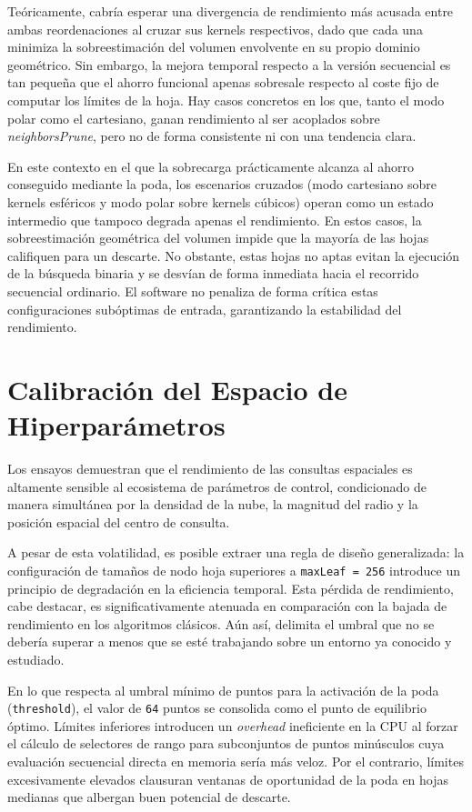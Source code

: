 Teóricamente, cabría esperar una divergencia de rendimiento más acusada entre ambas reordenaciones al cruzar sus kernels respectivos, dado que cada una minimiza la sobreestimación del volumen envolvente en su propio dominio geométrico. Sin embargo, la mejora temporal respecto a la versión secuencial es tan pequeña que el ahorro funcional apenas sobresale respecto al coste fijo de computar los límites de la hoja. Hay casos concretos en los que, tanto el modo polar como el cartesiano, ganan rendimiento al ser acoplados sobre \textit{neighborsPrune}, pero no de forma consistente ni con una tendencia clara.

En este contexto en el que la sobrecarga prácticamente alcanza al ahorro conseguido mediante la poda, los escenarios cruzados (modo cartesiano sobre kernels esféricos y modo polar sobre kernels cúbicos) operan como un estado intermedio que tampoco degrada apenas el rendimiento. En estos casos, la sobreestimación geométrica del volumen impide que la mayoría de las hojas califiquen para un descarte. No obstante, estas hojas no aptas evitan la ejecución de la búsqueda binaria y se desvían de forma inmediata hacia el recorrido secuencial ordinario. El software no penaliza de forma crítica estas configuraciones subóptimas de entrada, garantizando la estabilidad del rendimiento.

\section{Calibración del Espacio de Hiperparámetros}

Los ensayos demuestran que el rendimiento de las consultas espaciales es altamente sensible al ecosistema de parámetros de control, condicionado de manera simultánea por la densidad de la nube, la magnitud del radio y la posición espacial del centro de consulta. 

A pesar de esta volatilidad, es posible extraer una regla de diseño generalizada: la configuración de tamaños de nodo hoja superiores a \texttt{maxLeaf = 256} introduce un principio de degradación en la eficiencia temporal. Esta pérdida de rendimiento, cabe destacar, es significativamente atenuada en comparación con la bajada de rendimiento en los algoritmos clásicos. Aún así, delimita el umbral que no se debería superar a menos que se esté trabajando sobre un entorno ya conocido y estudiado.

En lo que respecta al umbral mínimo de puntos para la activación de la poda (\texttt{threshold}), el valor de \texttt{64} puntos se consolida como el punto de equilibrio óptimo. Límites inferiores introducen un \textit{overhead} ineficiente en la CPU al forzar el cálculo de selectores de rango para subconjuntos de puntos minúsculos cuya evaluación secuencial directa en memoria sería más veloz. Por el contrario, límites excesivamente elevados clausuran ventanas de oportunidad de la poda en hojas medianas que albergan buen potencial de descarte.

